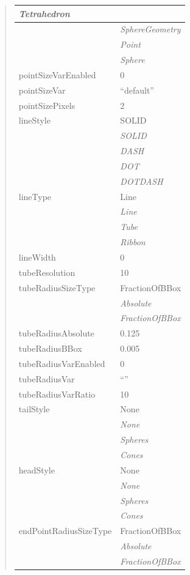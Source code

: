 \documentclass[letterpaper,10pt,english]{sphinxmanual}
\begin{document}
\begin{quote}
\begin{longtable}{|l|l|}
\emph{Tetrahedron}
\\
\hline & 
\emph{SphereGeometry}
\\
\hline & 
\emph{Point}
\\
\hline & 
\emph{Sphere}
\\
\hline
pointSizeVarEnabled
 & 
0
\\
\hline
pointSizeVar
 & 
``default''
\\
\hline
pointSizePixels
 & 
2
\\
\hline
lineStyle
 & 
SOLID
\\
\hline & 
\emph{SOLID}
\\
\hline & 
\emph{DASH}
\\
\hline & 
\emph{DOT}
\\
\hline & 
\emph{DOTDASH}
\\
\hline
lineType
 & 
Line
\\
\hline & 
\emph{Line}
\\
\hline & 
\emph{Tube}
\\
\hline & 
\emph{Ribbon}
\\
\hline
lineWidth
 & 
0
\\
\hline
tubeResolution
 & 
10
\\
\hline
tubeRadiusSizeType
 & 
FractionOfBBox
\\
\hline & 
\emph{Absolute}
\\
\hline & 
\emph{FractionOfBBox}
\\
\hline
tubeRadiusAbsolute
 & 
0.125
\\
\hline
tubeRadiusBBox
 & 
0.005
\\
\hline
tubeRadiusVarEnabled
 & 
0
\\
\hline
tubeRadiusVar
 & 
``''
\\
\hline
tubeRadiusVarRatio
 & 
10
\\
\hline
tailStyle
 & 
None
\\
\hline & 
\emph{None}
\\
\hline & 
\emph{Spheres}
\\
\hline & 
\emph{Cones}
\\
\hline
headStyle
 & 
None
\\
\hline & 
\emph{None}
\\
\hline & 
\emph{Spheres}
\\
\hline & 
\emph{Cones}
\\
\hline
endPointRadiusSizeType
 & 
FractionOfBBox
\\
\hline & 
\emph{Absolute}
\\
\hline & 
\emph{FractionOfBBox}
\\

\end{longtable}
\end{quote}
\end{document}

